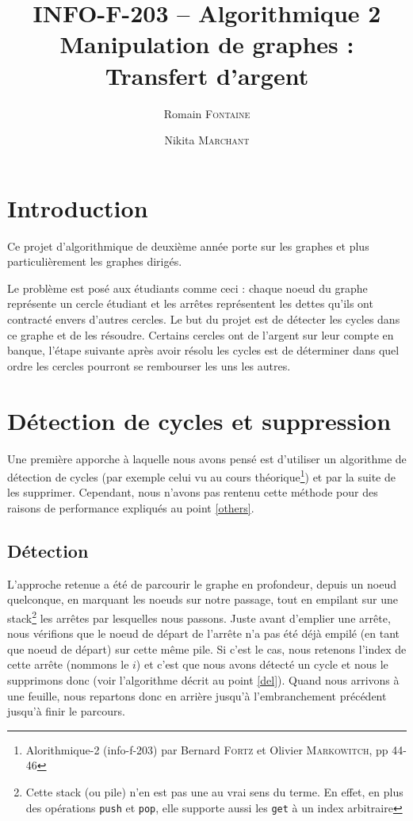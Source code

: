 \documentclass[12pt, oneside]{article}
\title{{\normalsize{INFO-F-203 -- Algorithmique 2}}\\Manipulation de graphes :\\ Transfert d’argent}
\author{Romain \textsc{Fontaine} \and Nikita \textsc{Marchant}}
\begin{document}
\maketitle

\section{Introduction}

Ce projet d'algorithmique de deuxième année porte sur les graphes et plus particulièrement les graphes dirigés.

Le problème est posé aux étudiants comme ceci : chaque noeud du graphe représente un cercle étudiant et les arrêtes représentent les dettes qu'ils ont contracté envers d'autres cercles. Le but du projet est de détecter les cycles dans ce graphe et de les résoudre. Certains cercles ont de l'argent sur leur compte en banque, l'étape suivante après avoir résolu les cycles  est de déterminer dans quel ordre les cercles pourront se rembourser les uns les autres.


\section{Détection de cycles et suppression}
Une première apporche à laquelle nous avons pensé est d'utiliser un algorithme de détection de cycles (par exemple celui vu au cours théorique\footnote{Alorithmique-2 (info-f-203) par Bernard \textsc{Fortz} et Olivier \textsc{Markowitch}, pp 44-46}) et par la suite de les supprimer. Cependant, nous n'avons pas rentenu cette méthode pour des raisons de performance expliqués au point \ref{others}.

\subsection{Détection}
\label{detect}
L'approche retenue a été de parcourir le graphe en profondeur, depuis un noeud quelconque, en marquant les noeuds sur notre passage, tout en empilant sur une stack\footnote{Cette stack (ou pile) n'en  est pas une au vrai sens du terme. En effet, en plus des opérations \texttt{push} et \texttt{pop}, elle supporte aussi les \texttt{get} à un index arbitraire} les arrêtes par lesquelles nous passons. Juste avant d'emplier une arrête, nous vérifions que le noeud de départ de l'arrête n'a pas été déjà empilé (en tant que noeud de départ) sur cette même pile. Si c'est le cas, nous retenons l'index de cette arrête (nommons le $i$) et c'est que nous avons détecté un cycle et nous le supprimons donc (voir l'algorithme décrit au point \ref{del}). Quand nous arrivons à une feuille, nous repartons donc en arrière jusqu'à l'embranchement précédent jusqu'à finir le parcours.
\end{document}
